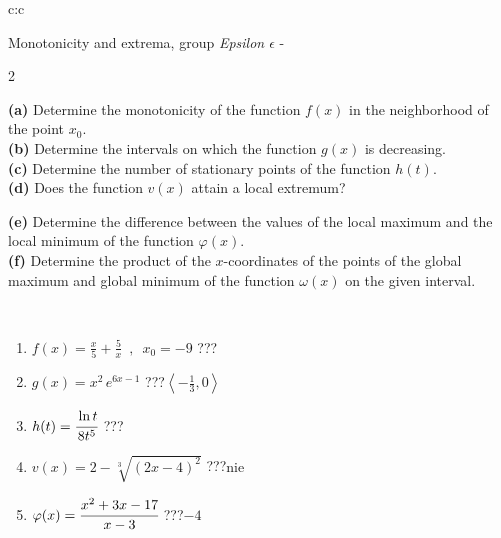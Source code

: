 \documentclass[10pt]{report}
\begin{document}
\begin{tabular}{c:c}
\begin{minipage}[c][104.5mm][t]{0.5\linewidth}
\begin{center}
\vspace{5mm}
{\huge Monotonicity and extrema, group \textit{Epsilon $\epsilon$} -}\\[5mm]
\begin{minipage}{0.95\linewidth}
\begin{center}
{\small \begin{multicols}{2} \raggedright
\textbf{(a)} Determine the monotonicity of the function \(f(x)\) in the neighborhood of the point \(x_0\). \\[1mm]
\textbf{(b)} Determine the intervals on which the function \(g(x)\) is decreasing. \\[1mm]
\textbf{(c)} Determine the number of stationary points of the function \(h(t)\). \\[1mm]
\textbf{(d)} Does the function \(v(x)\) attain a local extremum? \par \columnbreak
\textbf{(e)} Determine the difference between the values of the local maximum and the local minimum of the function \(\varphi(x)\). \\[1mm]
\textbf{(f)} Determine the product of the \(x\)-coordinates of the points of the global maximum and global minimum of the function \(\omega(x)\) on the given interval. \\[1mm]
\end{multicols}
}
\end{center}
\end{minipage}
\\[1mm]
\begin{minipage}{0.79\linewidth}
\begin{center}
\begin{varwidth}{\linewidth}
\setlength{\itemsep}{0pt}
\begin{enumerate}
\normalsize
\item $f(x)=\frac{x}{5}+\frac{5}{x} \enspace , \enspace x_0=-9$\quad \dotfill\; ???\;\dotfill \quad {}
\item $g(x)=x^2\, e^{6x-1}$\quad \dotfill\; ???\;\dotfill \quad $\left\langle-\frac{1}{3} , 0\right\rangle$
\item $h(t)=\cfrac{\ln t}{8t^5}$\quad \dotfill\; ???\;\dotfill {}
\item $v(x)=2-\sqrt[3]{(2x-4)^2}$\quad \dotfill\; ???\;\dotfill \quad $\text{nie}$
\item $\varphi(x)=\cfrac{x^2+3x-17}{x-3}$\quad \dotfill\; ???\;\dotfill \quad $-4$

\end{enumerate}
\end{varwidth}
\end{center}
\end{minipage}
\end{center}
\end{minipage}
\end{tabular}
\end{document}

